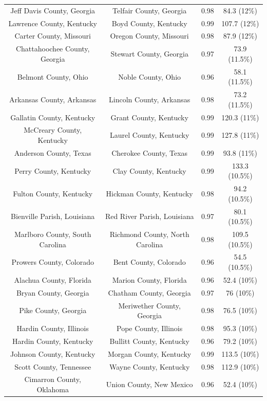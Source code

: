 \begin{longtable}{cccc}
  Jeff Davis County, Georgia & Telfair County, Georgia & 0.98 & 84.3 (12\%) \\ 
  Lawrence County, Kentucky & Boyd County, Kentucky & 0.99 & 107.7 (12\%) \\ 
  Carter County, Missouri & Oregon County, Missouri & 0.98 & 87.9 (12\%) \\ 
  Chattahoochee County, Georgia & Stewart County, Georgia & 0.97 & 73.9 (11.5\%) \\ 
  Belmont County, Ohio & Noble County, Ohio & 0.96 & 58.1 (11.5\%) \\ 
  Arkansas County, Arkansas & Lincoln County, Arkansas & 0.98 & 73.2 (11.5\%) \\ 
  Gallatin County, Kentucky & Grant County, Kentucky & 0.99 & 120.3 (11\%) \\ 
  McCreary County, Kentucky & Laurel County, Kentucky & 0.99 & 127.8 (11\%) \\ 
  Anderson County, Texas & Cherokee County, Texas & 0.99 & 93.8 (11\%) \\ 
  Perry County, Kentucky & Clay County, Kentucky & 0.99 & 133.3 (10.5\%) \\ 
  Fulton County, Kentucky & Hickman County, Kentucky & 0.98 & 94.2 (10.5\%) \\ 
  Bienville Parish, Louisiana & Red River Parish, Louisiana & 0.97 & 80.1 (10.5\%) \\ 
  Marlboro County, South Carolina & Richmond County, North Carolina & 0.98 & 109.5 (10.5\%) \\ 
  Prowers County, Colorado & Bent County, Colorado & 0.96 & 54.5 (10.5\%) \\ 
  Alachua County, Florida & Marion County, Florida & 0.96 & 52.4 (10\%) \\ 
  Bryan County, Georgia & Chatham County, Georgia & 0.97 & 76 (10\%) \\ 
  Pike County, Georgia & Meriwether County, Georgia & 0.98 & 76.5 (10\%) \\ 
  Hardin County, Illinois & Pope County, Illinois & 0.98 & 95.3 (10\%) \\ 
  Hardin County, Kentucky & Bullitt County, Kentucky & 0.96 & 79.2 (10\%) \\ 
  Johnson County, Kentucky & Morgan County, Kentucky & 0.99 & 113.5 (10\%) \\ 
  Scott County, Tennessee & Wayne County, Kentucky & 0.98 & 112.9 (10\%) \\ 
  Cimarron County, Oklahoma & Union County, New Mexico & 0.96 & 52.4 (10\%) \\ 

\end{longtable}
